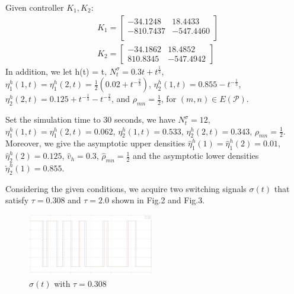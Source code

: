 \documentclass[twocolumn]{autart}    %
\begin{document}
\begin{exmp}
Given controller $K_{1},K_{2}$: 
\begin{equation}
    \begin{aligned}
        &K_{1} =  \begin{bmatrix}
            -34.1248 & 18.4433\\
            -810.7437 & -547.4460\\
        \end{bmatrix}\\
        &K_{2} =  \begin{bmatrix}
            -34.1862 & 18.4852\\
            810.8345 & -547.4942
        \end{bmatrix}
    \end{aligned}
    \nonumber
\end{equation}
In addition, we let h(t) = t, 
$N_{t}^{\sigma} = 0.3t+t^{\frac{1}{3}}$, 
$\eta^{h}_{1}(1,t) = \eta^{h}_{1}(2,t) = \frac{1}{2}(0.02+t^{-\frac{2}{3}})$, 
$\eta^{h}_{2}(1,t) = 0.855-t^{-\frac{1}{3}}$, 
$\eta^{h}_{2}(2,t) = 0.125+t^{-\frac{1}{3}}-t^{-\frac{2}{3}}$, and  
$\rho_{mn} = \frac{1}{2}$, for $(m,n) \in E(\mathcal{P})$.

Set the simulation time to 30 seconds, we have $N_{t}^{\sigma} = 12$, 
$\eta^{h}_{1}(1,t) = \eta^{h}_{1}(2,t) = 0.062$, 
$\eta^{h}_{2}(1,t) = 0.533$, 
$\eta^{h}_{2}(2,t) = 0.343$, 
$\rho_{mn} = \frac{1}{2}$.
Moreover, we give the asymptotic upper densities  
$\hat{\eta}^{h}_{1}(1) = \hat{\eta}^{h}_{1}(2) = 0.01$, 
$\hat{\eta}^{h}_{2}(2) = 0.125$, 
$\hat{v}_{h}=0.3$, $\hat{\rho}_{mn}=\frac{1}{2}$ and the asymptotic lower densities 
$\breve{\eta}^{h}_{2}(1) = 0.855$.

Considering the given conditions, we acquire two switching signals $\sigma(t)$ that satisfy $\tau=0.308$ and $\tau=2.0$ shown in Fig.2 and Fig.3.

\begin{figure}[htbp]
    \centering
    \includegraphics[width=0.49\textwidth,height=0.245\textwidth]{tau0.308.jpg}
    \caption{$\sigma(t)$ with $\tau=0.308$}
    \end{figure} 


\end{exmp}
\end{document}
